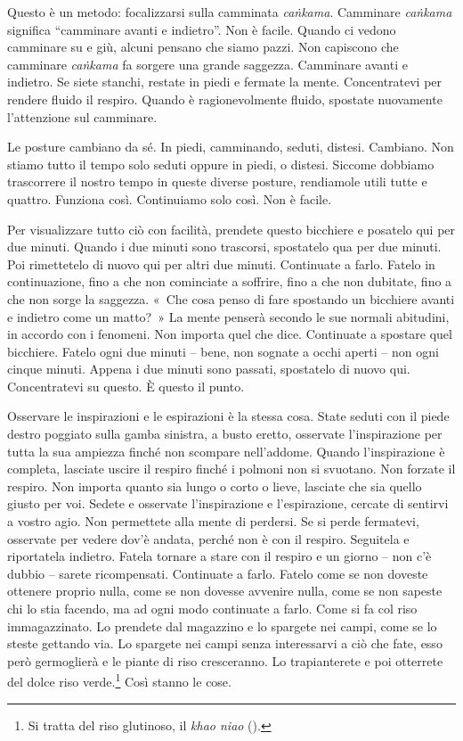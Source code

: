 Questo è un metodo: focalizzarsi sulla camminata \emph{caṅkama}.
Camminare \emph{caṅkama} significa ``camminare avanti e indietro''. Non
è facile. Quando ci vedono camminare su e giù, alcuni pensano che siamo
pazzi. Non capiscono che camminare \emph{caṅkama} fa sorgere una grande
saggezza. Camminare avanti e indietro. Se siete stanchi, restate in
piedi e fermate la mente. Concentratevi per rendere fluido il respiro.
Quando è ragionevolmente fluido, spostate nuovamente l'attenzione sul
camminare.

Le posture cambiano da sé. In piedi, camminando, seduti, distesi.
Cambiano. Non stiamo tutto il tempo solo seduti oppure in piedi, o
distesi. Siccome dobbiamo trascorrere il nostro tempo in queste diverse
posture, rendiamole utili tutte e quattro. Funziona così. Continuiamo
solo così. Non è facile.

Per visualizzare tutto ciò con facilità, prendete questo bicchiere e
posatelo qui per due minuti. Quando i due minuti sono trascorsi,
spostatelo qua per due minuti. Poi rimettetelo di nuovo qui per altri
due minuti. Continuate a farlo. Fatelo in continuazione, fino a che non
cominciate a soffrire, fino a che non dubitate, fino a che non sorge la
saggezza. «~Che cosa penso di fare spostando un bicchiere avanti e
indietro come un matto?~» La mente penserà secondo le sue normali
abitudini, in accordo con i fenomeni. Non importa quel che dice.
Continuate a spostare quel bicchiere. Fatelo ogni due minuti -- bene,
non sognate a occhi aperti -- non ogni cinque minuti. Appena i due
minuti sono passati, spostatelo di nuovo qui. Concentratevi su questo. È
questo il punto.

Osservare le inspirazioni e le espirazioni è la stessa cosa. State
seduti con il piede destro poggiato sulla gamba sinistra, a busto
eretto, osservate l'inspirazione per tutta la sua ampiezza finché non
scompare nell'addome. Quando l'inspirazione è completa, lasciate uscire
il respiro finché i polmoni non si svuotano. Non forzate il respiro. Non
importa quanto sia lungo o corto o lieve, lasciate che sia quello giusto
per voi. Sedete e osservate l'inspirazione e l'espirazione, cercate di
sentirvi a vostro agio. Non permettete alla mente di perdersi. Se si
perde fermatevi, osservate per vedere dov'è andata, perché non è con il
respiro. Seguitela e riportatela indietro. Fatela tornare a stare con il
respiro e un giorno -- non c'è dubbio -- sarete ricompensati. Continuate
a farlo. Fatelo come se non doveste ottenere proprio nulla, come se non
dovesse avvenire nulla, come se non sapeste chi lo stia facendo, ma ad
ogni modo continuate a farlo. Come si fa col riso immagazzinato. Lo
prendete dal magazzino e lo spargete nei campi, come se lo steste
gettando via. Lo spargete nei campi senza interessarvi a ciò che fate,
esso però germoglierà e le piante di riso cresceranno. Lo trapianterete
e poi otterrete del dolce riso verde.\footnote{Si tratta del riso
  glutinoso, il \emph{khao niao} ().} Così stanno le cose.

